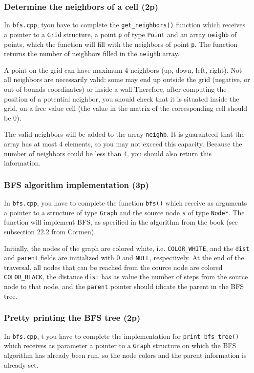 \documentclass[../en-fa-lab.tex]{subfiles}
\begin{document}
\subsubsection{Determine the neighbors of a cell (2p)}
In \texttt{bfs.cpp}, tyou have to complete the  \texttt{get\_neighbors()} function which receives
a pointer to a \texttt{Grid} structure, a point \texttt{p} of type \texttt{Point} and an array \texttt{neighb} of
points, which the function will fill with the neighbors of point  \texttt{p}. The function returns the number of neighbors filled in the \texttt{neighb} array.

A point on the grid can have maximum 4 neighbors (up, down, left, right). Not all neighbors are necessarily valid: some may end up outside the grid (negative, or out of bounds coordinates) or inside a wall.Therefore, after computing the position of a potential neighbor, you should check that it is situated inside the grid, on a free value cell (the value in the matrix of the corresponding cell should be 0).

The valid neighbors will be added to the array \texttt{neighb}. It is guaranteed that the array has at most 4 elements, so you may not exceed this capacity. Because the number of neighbors could be less than 4, you should also return this information.

\subsubsection{BFS algorithm implementation (3p)}
In \texttt{bfs.cpp}, you have to complete the function \texttt{bfs()} which receive as arguments a pointer to a structure of type \texttt{Graph} and the source node \texttt{s} of type \texttt{Node*}. The function will implement BFS, as specified in the algorithm from the book (see subsection 22.2 from Cormen).

Initially, the nodes of the graph are colored white, i.e. \texttt{COLOR\_WHITE}, and the \texttt{dist} and \texttt{parent} fields are initialized with 0 and \texttt{NULL}, respectively.  At the end of the traversal, all nodes that can be reached from the cource node are colored \texttt{COLOR\_BLACK}, the distance \texttt{dist} has as value the number of steps from the source node to that node, and the \texttt{parent} pointer should idicate the parent in the BFS
tree.

\subsubsection{Pretty printing the BFS tree (2p)}
In \texttt{bfs.cpp}, t you have to complete the implementation for \texttt{print\_bfs\_tree()} which receives as parameter a pointer to a \texttt{Graph} structure on which the BFS algorithm has already been run, so the node colors and the parent information is already set.
\end{document}
